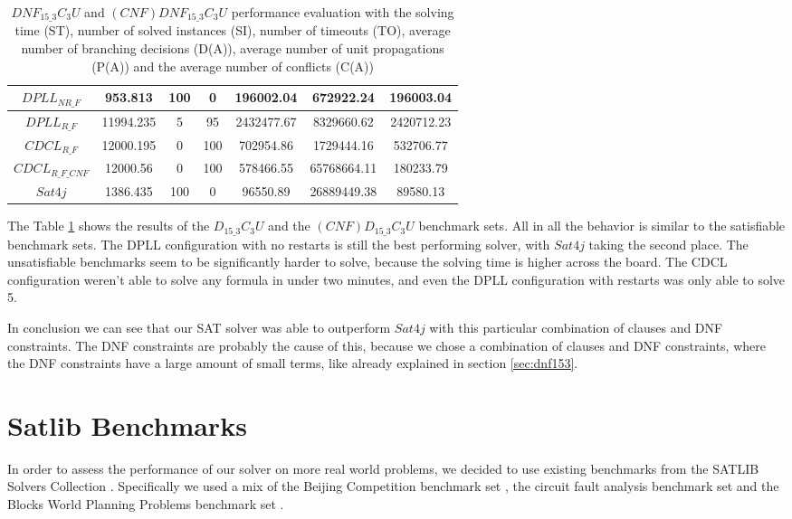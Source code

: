 \begin{table}[!htb]
\centering
\caption[$DNF_{15\_3}C_3U$ and $(CNF)DNF_{15\_3}C_3U$ performance evaluation]{$DNF_{15\_3}C_3U$ and $(CNF)DNF_{15\_3}C_3U$ performance evaluation with the solving time (ST), number of solved instances (SI), number of timeouts (TO), average number of branching decisions (D(A)), average number of unit propagations (P(A)) and the average number of conflicts (C(A))}
\label{tab:dnfClauseBenchmarkUNSAT}
\begin{tabular}{|c|c|c|c|c|c|c|}
\hline
$DPLL_{NR\_F}$ & 953.813 & 100 & 0 & 196002.04 & 672922.24 & 196003.04 \\ 
\hline
$DPLL_{R\_F}$ & 11994.235 & 5 & 95 & 2432477.67 & 8329660.62 & 2420712.23 \\ 
\hline
$CDCL_{R\_F}$ & 12000.195 & 0 & 100 & 702954.86 & 1729444.16 & 532706.77 \\ 
\hline
$CDCL_{R\_F\_CNF}$ & 12000.56 & 0 & 100 & 578466.55 & 65768664.11 & 180233.79 \\ 
\hline
$Sat4j$ & 1386.435 & 100 & 0 & 96550.89 & 26889449.38 & 89580.13 \\ 
\hline
\end{tabular}
\end{table}

The Table \ref{tab:dnfClauseBenchmarkUNSAT} shows the results of the $D_{15\_3}C_3U$ and the $(CNF)D_{15\_3}C_3U$ benchmark sets. All in all the behavior is similar to the satisfiable benchmark sets. The DPLL configuration with no restarts is still the best performing solver, with $Sat4j$ taking the second place. The unsatisfiable benchmarks seem to be significantly harder to solve, because the solving time is higher across the board. The CDCL configuration weren't able to solve any formula in under two minutes, and even the DPLL configuration with restarts was only able to solve 5.

In conclusion we can see that our SAT solver was able to outperform $Sat4j$ with this particular combination of clauses and DNF constraints. The DNF constraints are probably the cause of this, because we chose a combination of clauses and DNF constraints, where the DNF constraints have a large amount of small terms, like already explained in section \ref{sec:dnf153}.

\section{Satlib Benchmarks}

In order to assess the performance of our solver on more real world problems, we decided to use existing benchmarks from the SATLIB Solvers Collection \cite{noauthor_satlib_nodate-3}. Specifically we used a mix of the Beijing Competition benchmark set \cite{noauthor_satlib_nodate}, the circuit fault analysis benchmark set \cite{noauthor_satlib_nodate-1} and the Blocks World Planning Problems benchmark set \cite{noauthor_satlib_nodate-2}.

